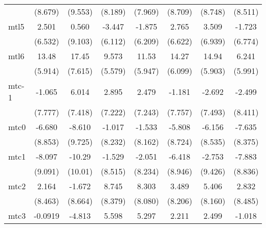 \documentclass{article}
\begin{document}
{\begin{longtable}{l*{7}{c}}
                &  (8.679)         &  (9.553)         &  (8.189)         &  (7.969)         &  (8.709)         &  (8.748)         &  (8.511)         \\
mtl5            &    2.501         &    0.560         &   -3.447         &   -1.875         &    2.765         &    3.509         &   -1.723         \\
                &  (6.532)         &  (9.103)         &  (6.112)         &  (6.209)         &  (6.622)         &  (6.939)         &  (6.774)         \\
mtl6            &    13.48\sym{*}  &    17.45\sym{*}  &    9.573         &    11.53         &    14.27\sym{*}  &    14.94\sym{*}  &    6.241         \\
                &  (5.914)         &  (7.615)         &  (5.579)         &  (5.947)         &  (6.099)         &  (5.903)         &  (5.991)         \\
mtc-1           &   -1.065         &    6.014         &    2.895         &    2.479         &   -1.181         &   -2.692         &   -2.499         \\
                &  (7.777)         &  (7.418)         &  (7.222)         &  (7.243)         &  (7.757)         &  (7.493)         &  (8.411)         \\
mtc0            &   -6.680         &   -8.610         &   -1.017         &   -1.533         &   -5.808         &   -6.156         &   -7.635         \\
                &  (8.853)         &  (9.725)         &  (8.232)         &  (8.162)         &  (8.724)         &  (8.535)         &  (8.375)         \\
mtc1            &   -8.097         &   -10.29         &   -1.529         &   -2.051         &   -6.418         &   -2.753         &   -7.883         \\
                &  (9.091)         &  (10.01)         &  (8.515)         &  (8.234)         &  (8.946)         &  (9.426)         &  (8.836)         \\
mtc2            &    2.164         &   -1.672         &    8.745         &    8.303         &    3.489         &    5.406         &    2.832         \\
                &  (8.463)         &  (8.664)         &  (8.379)         &  (8.080)         &  (8.206)         &  (8.160)         &  (8.485)         \\
mtc3            &  -0.0919         &   -4.813         &    5.598         &    5.297         &    2.211         &    2.499         &   -1.018         \\

\end{longtable}}
\end{document}
